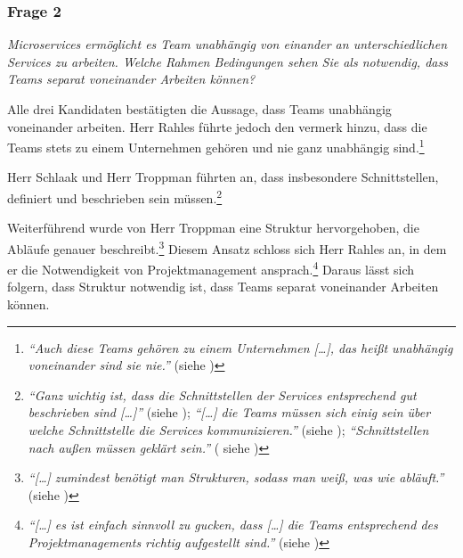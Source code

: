 \subsubsection{Frage 2}

\textit{Microservices ermöglicht es Team unabhängig von einander an unterschiedlichen Services zu arbeiten. Welche Rahmen Bedingungen sehen Sie als notwendig, dass Teams separat voneinander Arbeiten können?}

Alle drei Kandidaten bestätigten die Aussage, dass Teams unabhängig voneinander arbeiten. Herr Rahles führte jedoch den vermerk hinzu, dass die Teams stets zu einem Unternehmen gehören und nie ganz unabhängig sind.\footnote{
\textit{\enquote{Auch diese Teams gehören zu einem Unternehmen […], das heißt unabhängig voneinander sind sie nie.}} (siehe )
}

Herr Schlaak und Herr Troppman führten an, dass insbesondere Schnittstellen, definiert und beschrieben sein müssen.\footnote{
\textit{\enquote{Ganz wichtig ist, dass die Schnittstellen der Services entsprechend gut beschrieben sind […]}} (siehe ); \textit{\enquote{[…] die Teams müssen sich einig sein über welche Schnittstelle die Services kommunizieren.}} (siehe ); \textit{\enquote{Schnittstellen nach außen müssen geklärt sein.}} ( siehe )
}

Weiterführend wurde von Herr Troppman eine Struktur hervorgehoben, die Abläufe genauer beschreibt.\footnote{
\textit{\enquote{[…] zumindest benötigt man Strukturen, sodass man weiß, was wie abläuft.}} (siehe )
} Diesem Ansatz schloss sich Herr Rahles an, in dem er die Notwendigkeit von Projektmanagement ansprach.\footnote{
\textit{\enquote{[…] es ist einfach sinnvoll zu gucken, dass […] die Teams entsprechend des Projektmanagements richtig aufgestellt sind.}} (siehe )
} Daraus lässt sich folgern, dass Struktur notwendig ist, dass Teams separat voneinander Arbeiten können.
